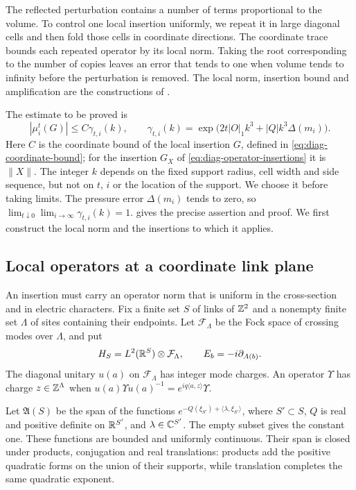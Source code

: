 The reflected perturbation contains a number of terms proportional to
the volume. To control one local insertion uniformly, we repeat it
in large diagonal cells and then fold those cells in coordinate
directions. The coordinate trace bounds each repeated operator by
its local norm. Taking the root corresponding to the number of
copies leaves an error that tends to one when volume tends to
infinity before the perturbation is removed. The local norm, insertion
bound and amplification are the constructions of
\cite[Lemma~8.13, Proposition~8.26 and Theorem~8.32]{ChamberQED}.

The estimate to be proved is
\[
 |\mu_i^t(G)|\le C\gamma_{t,i}(k),\qquad
 \gamma_{t,i}(k)=
 \exp\bigl(2t|O|_1k^3+|Q|k^3\Delta(m_i)\bigr).
\]
Here $C$ is the coordinate bound of the local insertion $G$, defined
in \eqref{eq:diag-coordinate-bound}; for the insertion $G_X$ of
\eqref{eq:diag-operator-insertions} it is $\|X\|$.
The integer $k$ depends on the fixed support
radius, cell width and side sequence, but not on $t$, $i$ or the
location of the support. We choose it before taking limits. The
pressure error $\Delta(m_i)$ tends to zero, so
$\lim_{t\downarrow0}\lim_{i\to\infty}\gamma_{t,i}(k)=1$.
 gives the precise assertion and proof.
We first construct the local norm and the insertions to which it applies.

\subsection{Local operators at a coordinate link plane}\label{subsec:diag-local-operators}

An insertion must carry an operator norm that is uniform in the
cross-section and in electric characters. Fix a finite set $S$ of
links of $\mathbb Z^2$ and a nonempty finite set $\Lambda$ of sites
containing their endpoints. Let $\mathcal F_\Lambda$ be the Fock
space of crossing modes over $\Lambda$, and put
\[
 H_S=L^2(\mathbb R^S)\otimes\mathcal F_\Lambda,
 \qquad E_b=-i\partial_{A(b)}.
\]
The diagonal unitary $u(a)$ on $\mathcal F_\Lambda$ has integer mode
charges. An operator $\Upsilon$ has charge $z\in\mathbb Z^\Lambda$ when
$u(a)\Upsilon u(a)^{-1}=e^{iq\langle a,z\rangle}\Upsilon$.

Let $\mathfrak A(S)$ be the span of the functions
$e^{-Q(\xi_{S'})+\langle\lambda,\xi_{S'}\rangle}$, where
$S'\subset S$, $Q$ is real and positive definite on $\mathbb R^{S'}$,
and $\lambda\in\mathbb C^{S'}$. The empty subset gives the constant one.
These functions are bounded and uniformly continuous. Their span
is closed under products, conjugation and real translations: products
add the positive quadratic forms on the union of their supports,
while translation completes the same quadratic exponent.

